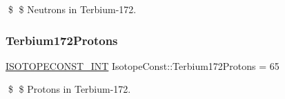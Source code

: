 \$ \$ Neutrons in Terbium-\/172. \mbox{\label{group___isotope_const-_terbium-_tb172_gae433ab37a9e7208aaa083d584f0ad8df}} 
\subsubsection{\texorpdfstring{Terbium172\+Protons}{Terbium172Protons}}
{\footnotesize\ttfamily \mbox{\hyperlink{group___isotope_const-_macros_ga5f18360b3e99483a35c32d789e62621c}{I\+S\+O\+T\+O\+P\+E\+C\+O\+N\+S\+T\+\_\+\+I\+NT}} Isotope\+Const\+::\+Terbium172\+Protons = 65}

\$ \$ Protons in Terbium-\/172. 